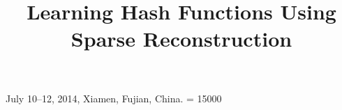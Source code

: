 \documentclass{sig-alternate}
\begin{document}
%
 {July 10--12, 2014, Xiamen, Fujian, China.}
\widowpenalty = 15000

\title{Learning Hash Functions Using Sparse Reconstruction}
%
%
%
%
%
\end{document}
